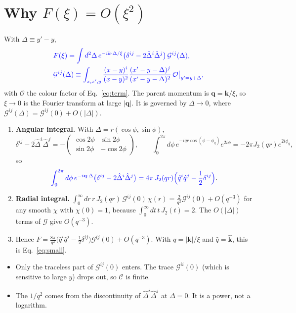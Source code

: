\documentclass[10pt]{article}
\numberwithin{equation}{section}
\newcommand{\Dh}{\hat\Delta}
\newcommand{\OO}{\mathcal O}
\newcommand{\GG}{\mathcal G}
\newcommand{\CC}{\mathcal C}
\newcommand{\new}[1]{{\color{blue}#1}}
\begin{document}
\section{Why \texorpdfstring{$F(\xi)=O(\xi^2)$}{F(xi) = O(xi^2)}}\label{sec:small}
With $\Delta\equiv y'-y$,
\begin{equation}
\new{\begin{aligned}&F(\xi)=\int d^2\Delta\,e^{-ik\cdot\Delta/\xi}\big(\delta^{ij}-2\Dh^i\Dh^j\big)\,\GG^{ij}(\Delta),\\
&\GG^{ij}(\Delta)\equiv\int_{x,x',y}\frac{(x-y)^i}{(x-y)^2}\frac{(x'-y-\Delta)^j}{(x'-y-\Delta)^2}\,\OO\big|_{y'=y+\Delta},\end{aligned}}
\end{equation}
with $\OO$ the colour factor of Eq.~\eqref{eq:term}. The parent momentum is $\mathbf q=\mathbf k/\xi$, so $\xi\to0$ is the Fourier transform at large $|\mathbf q|$. It is governed by $\Delta\to0$, where $\GG^{ij}(\Delta)=\GG^{ij}(0)+O(|\Delta|)$.
\begin{enumerate}
\item \textbf{Angular integral.} With $\Delta=r(\cos\phi,\sin\phi)$,
\begin{equation*}
\delta^{ij}-2\Dh^i\Dh^j=-\begin{pmatrix}\cos2\phi&\sin2\phi\\\sin2\phi&-\cos2\phi\end{pmatrix},\qquad\int_0^{2\pi}d\phi\,e^{-iqr\cos(\phi-\phi_q)}e^{2i\phi}=-2\pi J_2(qr)e^{2i\phi_q},
\end{equation*}
so
\begin{equation}
\new{\int_0^{2\pi}d\phi\,e^{-i\mathbf q\cdot\Delta}\big(\delta^{ij}-2\Dh^i\Dh^j\big)=4\pi\,J_2(qr)\Big(\hat q^i\hat q^j-\frac12\delta^{ij}\Big)}.
\end{equation}
\item \textbf{Radial integral.} $\int_0^\infty dr\,r\,J_2(qr)\,\GG^{ij}(0)\,\chi(r)=\frac{2}{q^2}\GG^{ij}(0)+O(q^{-3})$ for any smooth $\chi$ with $\chi(0)=1$, because $\int_0^\infty dt\,t\,J_2(t)=2$. The $O(|\Delta|)$ terms of $\GG$ give $O(q^{-3})$.
\item Hence $F=\frac{8\pi}{q^2}\big(\hat q^i\hat q^j-\frac12\delta^{ij}\big)\GG^{ij}(0)+O(q^{-3})$. With $q=|\mathbf k|/\xi$ and $\hat q=\hat{\mathbf k}$, this is Eq.~\eqref{eq:small}.
\end{enumerate}
\begin{itemize}
\item Only the traceless part of $\GG^{ij}(0)$ enters. The trace $\GG^{ii}(0)$ (which is sensitive to large $y$) drops out, so $\CC$ is finite.
\item The $1/q^2$ comes from the discontinuity of $\Dh^i\Dh^j$ at $\Delta=0$. It is a power, not a logarithm.
\end{itemize}
\end{document}
